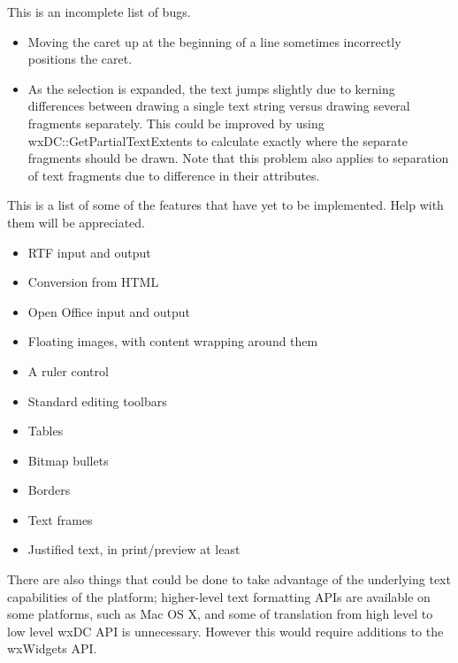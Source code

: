 
This is an incomplete list of bugs.

\begin{itemize}\itemsep=0pt
\item Moving the caret up at the beginning of a line sometimes incorrectly positions the
caret.
\item As the selection is expanded, the text jumps slightly due to kerning differences between
drawing a single text string versus drawing several fragments separately. This could
be improved by using wxDC::GetPartialTextExtents to calculate exactly where the separate fragments
should be drawn. Note that this problem also applies to separation of text fragments due to difference in their attributes.
\end{itemize}


This is a list of some of the features that have yet to be implemented. Help with them will be appreciated.

\begin{itemize}\itemsep=0pt
\item RTF input and output
\item Conversion from HTML
\item Open Office input and output
\item Floating images, with content wrapping around them
\item A ruler control
\item Standard editing toolbars
\item Tables
\item Bitmap bullets
\item Borders
\item Text frames
\item Justified text, in print/preview at least
\end{itemize}

There are also things that could be done to take advantage of the underlying text capabilities of the platform;
higher-level text formatting APIs are available on some platforms, such as Mac OS X, and some of translation from
high level to low level wxDC API is unnecessary. However this would require additions to the wxWidgets API.

